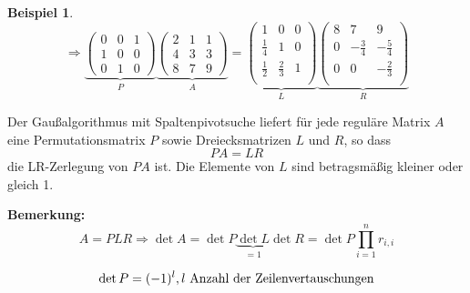 \documentclass[a4paper,10pt]{scrartcl}
\newtheorem[L]{satz}{Satz}[section]
\newtheorem{bsp}{Beispiel}[section]
\newtheorem[S]{beweis}{Beweis}
\newtheorem[S]{beh}{Behauptung}
\begin{document}
\begin{bsp}
  \[
    \Rightarrow
    \underbrace{\begin{pmatrix}
       0 & 0 & 1 \\
       1 & 0 & 0 \\
       0 & 1 & 0
    \end{pmatrix}}_P
    \underbrace{\begin{pmatrix}
       2 & 1 & 1 \\
       4 & 3 & 3 \\
       8 & 7 & 9
    \end{pmatrix}}_A
    =
    \underbrace{\begin{pmatrix}
       1 & 0 & 0 \\
       \frac{1}{4} & 1 & 0 \\
       \frac{1}{2} & \frac{2}{3} & 1 \\
    \end{pmatrix}}_L
    \underbrace{\begin{pmatrix}
       8 & 7 & 9 \\
       0 & -\frac{3}{4} & -\frac{5}{4} \\
       0 & 0 & -\frac{2}{3} \\
    \end{pmatrix}}_R
  \]
\end{bsp}

\begin{satz}
  Der Gaußalgorithmus mit Spaltenpivotsuche liefert für jede reguläre Matrix $A$ eine Permutationsmatrix $P$ sowie Dreiecksmatrizen $L$ und $R$, so dass
  \[
    PA = LR
  \]
  die LR-Zerlegung von $PA$ ist. Die Elemente von $L$ sind betragsmäßig kleiner oder gleich 1.
\end{satz}

\textbf{Bemerkung:}
\[
  A = PLR \Rightarrow \det A = \det P \underbrace{\det L}_{=1} \det R = \det P \prod_{i=1}^n r_{i,i}
\]

\[
  \det P = (-1)^l, l\textnormal{ Anzahl der Zeilenvertauschungen}
\]
\end{document}

